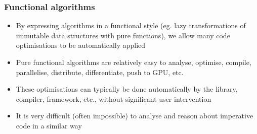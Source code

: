 \documentclass[mathserif,handout]{beamer}
\begin{document}
\begin{frame}
  \frametitle{Functional algorithms}
  \begin{itemize}
  \item By expressing algorithms in a functional style (eg. lazy transformations of immutable data structures with pure functions), we allow many code optimisations to be automatically applied
  \item \alert{Pure functional} algorithms are relatively easy to \alert{analyse}, \alert{optimise}, \alert{compile}, \alert{parallelise}, \alert{distribute}, \alert{differentiate}, push to GPU, etc.
  \item These optimisations can typically be done \alert{automatically} by the library, compiler, framework, etc., without significant user intervention
    \item It is very difficult (often impossible) to analyse and reason about imperative code in a similar way
  \end{itemize}
\end{frame}

\end{document}
